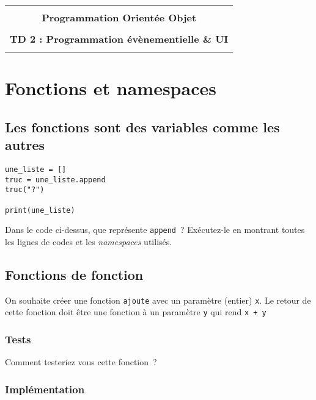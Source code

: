 \documentclass[12pt]{article}
\begin{document}
    \begin{center}
      \begin{tabular}{c}
      \hline
    \\
        {\bf \textsf {\Large Programmation Orientée Objet}}\\
    \\
        {\bf \textsf {\Large TD 2 : Programmation évènementielle \& UI}}\\
    \\
        \hline
      \end{tabular}
    \end{center}
    \vspace{15mm}

\section{Fonctions et namespaces}

\subsection{Les fonctions sont des variables comme les autres}


\lstset{language=Python}
\begin{lstlisting}
une_liste = []
truc = une_liste.append
truc("?")

print(une_liste)
\end{lstlisting}




Dans le code ci-dessus, que représente \verb|append|~? Exécutez-le  en montrant toutes les lignes de codes et les {\em namespaces} utilisés.


\subsection{Fonctions de fonction}

On souhaite créer une fonction \verb|ajoute| avec un paramètre (entier) \verb|x|. Le retour de cette fonction doit être une fonction à un paramètre \verb|y| qui rend \verb|x + y|

\subsubsection{Tests}

Comment testeriez vous cette fonction~?

\subsubsection{Implémentation}
\end{document}
